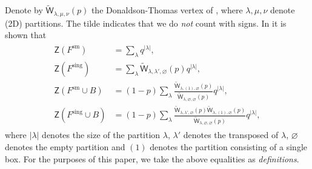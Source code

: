 \documentclass{amsart}
\theoremstyle{definition}
\newcommand{\sm}{\mathrm{sm}}
\newcommand{\sing}{\mathrm{sing}}
\newcommand{\sfW} {\mathsf{W}}
\newcommand{\sfZ} {\mathsf{Z}}
\begin{document}
Denote by $\tilde{\sfW}_{\lambda,\mu,\nu}(p)$ the Donaldson-Thomas vertex of \cite{MNOP1, MNOP2}, where $\lambda, \mu, \nu$ denote (2D) partitions. The tilde indicates that we do \emph{not} count with signs. In \cite{BK} it is shown that
\begin{align} \label{Zdef}
\begin{split}
\sfZ(F^{\sm}) &= \sum_\lambda q^{|\lambda|}, \\
\sfZ(F^{\sing}) &= \sum_\lambda \tilde{\sfW}_{\lambda,\lambda',\varnothing}(p) q^{|\lambda|}, \\
\sfZ(F^{\sm} \cup B) &= (1-p) \sum_\lambda \frac{\tilde{\sfW}_{\lambda, (1), \varnothing}(p)}{\tilde{\sfW}_{\lambda, \varnothing, \varnothing}(p)} q^{|\lambda|}, \\
\sfZ(F^{\sing} \cup B) &= (1-p) \sum_\lambda \frac{\tilde{\sfW}_{\lambda, \lambda', \varnothing}(p) \tilde{\sfW}_{\lambda, (1), \varnothing}(p)}{\tilde{\sfW}_{\lambda, \varnothing, \varnothing}(p)} q^{|\lambda|},
\end{split}
\end{align}
where $|\lambda|$ denotes the size of the partition $\lambda$, $\lambda'$ denotes the transposed of $\lambda$, $\varnothing$ denotes the empty partition and $(1)$ denotes the partition consisting of a single box. For the purposes of this paper, we take the above equalities as \emph{definitions}.
\end{document}
